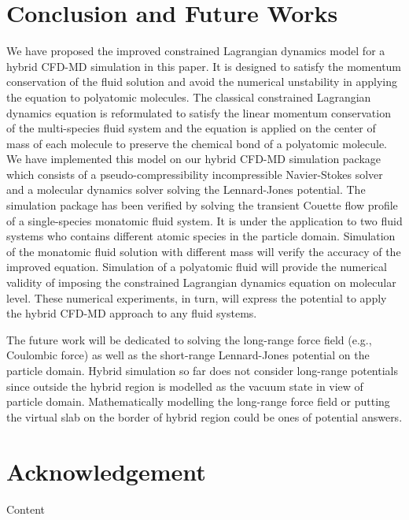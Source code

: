 \documentclass[]{aiaa-tc}%
\begin{document}


\section{Conclusion and Future Works}
\label{sec:conclusion}

We have proposed the improved constrained Lagrangian dynamics model for 
a hybrid CFD-MD simulation in this paper. It is designed to satisfy 
the momentum conservation of the fluid solution and avoid the numerical
unstability in applying the equation to polyatomic molecules. The 
classical constrained Lagrangian dynamics equation is reformulated
to satisfy the linear momentum conservation of the multi-species fluid
system and the equation is applied on the center of mass of each 
molecule to preserve the chemical bond of a polyatomic molecule.
We have implemented this model on our hybrid CFD-MD simulation package
which consists of a pseudo-compressibility incompressible Navier-Stokes
solver and a molecular dynamics solver solving the Lennard-Jones
potential. The simulation package has been verified by solving the 
transient Couette flow profile of a single-species monatomic fluid 
system.
It is under the application to two fluid systems who contains different
atomic species in the particle domain. Simulation of the monatomic 
fluid solution with different mass will verify the accuracy of
the improved equation. Simulation of a polyatomic fluid will provide 
the numerical validity of imposing the constrained Lagrangian dynamics
equation on molecular level. These numerical experiments, in turn, will
express the potential to apply the hybrid CFD-MD approach to any fluid
systems.

The future work will be dedicated to solving the long-range force
field (e.g., Coulombic force) as well as the short-range Lennard-Jones
potential on the particle domain. Hybrid simulation so far does not
consider long-range potentials since outside the hybrid region is
modelled as the vacuum state in view of particle domain. Mathematically
modelling the long-range force field or putting the virtual slab 
on the border of hybrid region could be ones of potential answers.



\section*{Acknowledgement}

Content





\end{document}
